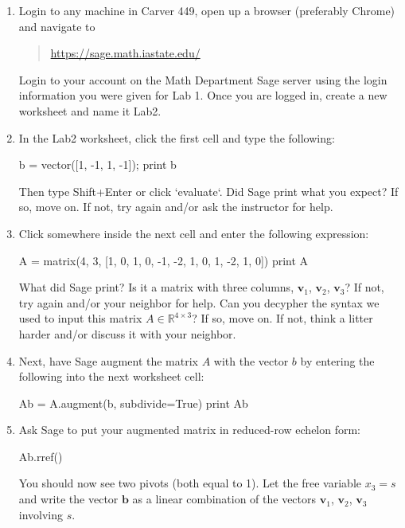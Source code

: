 \documentclass[fleqn,11pt]{paper}
\theoremstyle{remark}
\newcommand\R{\fld{R}}
\renewcommand{\vec}[1]{\mathbf{#1}}
\newcommand{\<}{\ensuremath{\langle}}
\renewcommand{\>}{\ensuremath{\rangle}}
\newcommand\fld[1]{\ensuremath{\mathbb{#1}}}
\newcommand\vb{\vec{b}}
\newcommand\vv{\vec{v}}
\begin{document}
  \begin{enumerate}
  \item Login to any machine in Carver 449, open up a browser (preferably Chrome) and navigate to

    \begin{quote}
      \url{https://sage.math.iastate.edu/}
    \end{quote}

    Login to your account on the Math Department Sage server using the login information you
    were given for Lab 1. Once you are logged in, create a new worksheet and name it Lab2.  

    \item In the Lab2 worksheet, click the first cell and type the following:
    \begin{sageblock}
      b = vector([1, -1, 1, -1]); print b
    \end{sageblock}
    Then type Shift+Enter or click `evaluate`.
    Did Sage print what you expect? If so, move on.  If not, try again and/or ask the instructor for help.
  
  \item Click somewhere inside the next cell and enter the following  expression:
    \begin{sageblock}
      A = matrix(4, 3, [1, 0, 1, 0, -1, -2, 1, 0, 1, -2, 1, 0]) 
      print A
    \end{sageblock}
    What did Sage print?  Is it a matrix with three columns, 
    $\vv_1$, $\vv_2$, $\vv_3$? If not, try again and/or your neighbor for help.
    Can you decypher the syntax we used to input this matrix $A \in \R^{4\times 3}$?
    If so, move on.  If not, think a litter harder and/or discuss it with your neighbor.
\item Next, have Sage augment the matrix $A$ with the vector $b$ by entering the following into the
  next worksheet cell:
    \begin{sageblock}
      Ab = A.augment(b, subdivide=True)
      print Ab
    \end{sageblock}
\item Ask Sage to put your augmented matrix in reduced-row echelon form:
    \begin{sageblock}
      Ab.rref()
    \end{sageblock}
    You should now see two pivots (both equal to 1).  Let the free variable $x_3 = s$ and write 
    the vector $\vb$ as a linear combination of the vectors $\vv_1$, $\vv_2$, $\vv_3$
    involving $s$.
  \end{enumerate}
\end{document}
